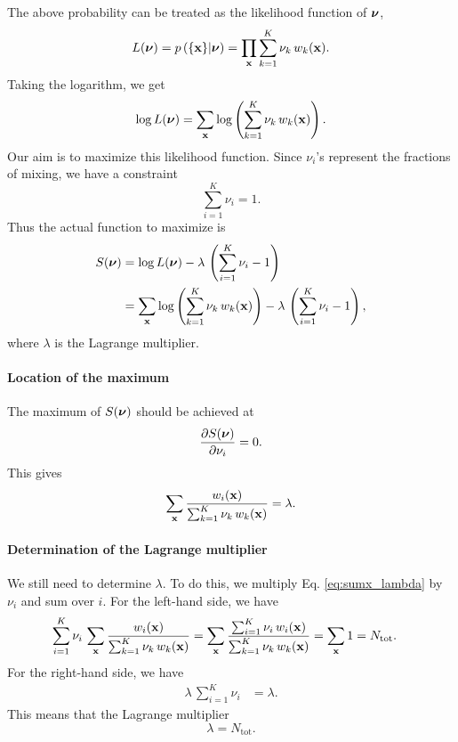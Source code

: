 \documentclass[aip,jcp,preprint,notitlepage, superscriptaddress]{revtex4-1}
\begin{document}
The above probability can be treated as
the likelihood function of $\bm{\mathrm{\nu}}$,
%
\begin{align}
  L(\bm{\mathrm{\nu}})
  = p\left( \{ \bm{\mathrm{x}} \} | \bm{\mathrm{\nu}} \right)
  =
  \prod_{\bm{\mathrm{x}}}
    \sum_{ k = 1 }^K
      \nu_k \, w_k(\bm{\mathrm{x}}).
\end{align}
%
Taking the logarithm,
we get
%
\begin{align}
  \log L(\bm{\mathrm{\nu}})
  =
  \sum_{\bm{\mathrm{x}}}
  \log\left(
  \sum_{ k = 1 }^K
    \nu_k \, w_k(\bm{\mathrm{x}})
  \right).
\end{align}
%
Our aim is to maximize this likelihood function.
%
Since $\nu_i$'s represent the fractions of mixing,
we have a constraint
%
\begin{equation}
  \sum_{i = 1}^K \nu_i = 1.
  \label{eq:constraint_nu}
\end{equation}
%
Thus the actual function to maximize is
%
\begin{align*}
  S(\bm{\mathrm{\nu}})
  &=
  \log L(\bm{\mathrm{\nu}}) - \lambda \,
    \left( \sum_{i = 1}^K \nu_i - 1 \right)
  \notag \\
  &=
  \sum_{\bm{\mathrm{x}}}
  \log\left(
  \sum_{ k = 1 }^K
    \nu_k \, w_k(\bm{\mathrm{x}})
  \right)
  -
  \lambda \,
  \left(
    \sum_{i = 1}^K \nu_i - 1
  \right),
\end{align*}
where $\lambda$ is the Lagrange multiplier.




\paragraph{Location of the maximum}



The maximum of $S(\bm{\mathrm{\nu}})$
should be achieved at
\[
  \frac{ \partial S(\bm{\mathrm{\nu}}) }
  { \partial \nu_i } = 0.
\]
%
This gives
%
\begin{align}
  \sum_{\bm{\mathrm{x}}}
    \frac{ w_i(\bm{\mathrm{x}}) }
    { \sum_{k = 1}^K \nu_k \, w_k(\bm{\mathrm{x}}) }
  =
  \lambda.
  \label{eq:sumx_lambda}
\end{align}



\paragraph{Determination of the Lagrange multiplier}



We still need to determine $\lambda$.
%
To do this, we multiply Eq. \eqref{eq:sumx_lambda}
by $\nu_i$ and sum over $i$.
For the left-hand side,
we have
%
\begin{align*}
  \sum_{i = 1}^K \nu_i \, \sum_{\bm{\mathrm{x}}}
    \frac{ w_i(\bm{\mathrm{x}}) }
    { \sum_{k = 1}^K \nu_k \, w_k(\bm{\mathrm{x}}) }
  &=
  \sum_{\bm{\mathrm{x}}}
    \frac
    { \sum_{i = 1}^K \nu_i \, w_i(\bm{\mathrm{x}}) }
    { \sum_{k = 1}^K \nu_k \, w_k(\bm{\mathrm{x}}) }
  = \sum_{\bm{\mathrm{x}}} 1 = N_\mathrm{tot}.
\end{align*}
%
For the right-hand side,
we have
%
\begin{align*}
  \lambda \, \sum_{i = 1}^K \nu_i
  &=
  \lambda.
\end{align*}
%
This means that the Lagrange multiplier
\[
  \lambda = N_\mathrm{tot}.
\]
\end{document}
